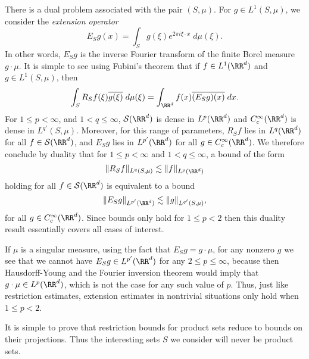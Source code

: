There is a dual problem associated with the pair $(S,\mu)$. For $g \in L^1(S,\mu)$, we consider the \emph{extension operator}
%
\[ E_S g(x) = \int_S g(\xi) e^{2 \pi i \xi \cdot x}\; d\mu(\xi). \]
%
In other words, $E_S g$ is the inverse Fourier transform of the finite Borel measure $g \cdot \mu$. It is simple to see using Fubini's theorem that if $f \in L^1(\RR^d)$ and $g \in L^1(S,\mu)$, then
%
\[ \int_S R_S f(\xi) \overline{g(\xi)}\; d\mu(\xi) = \int_{\RR^d} f(x) \overline{(E_S g)(x)}\; dx. \]
%
For $1 \leq p < \infty$, and $1 < q \leq \infty$, $\mathcal{S}(\RR^d)$ is dense in $L^p(\RR^d)$ and $C_c^\infty(\RR^d)$ is dense in $L^{q'}(S,\mu)$. Moreover, for this range of parameters, $R_S f$ lies in $L^q(\RR^d)$ for all $f \in \mathcal{S}(\RR^d)$, and $E_S g$ lies in $L^{p'}(\RR^d)$ for all $g \in C_c^\infty(\RR^d)$. We therefore conclude by duality that for $1 \leq p < \infty$ and $1 < q \leq \infty$, a bound of the form
%
\[ \| R_S f \|_{L^q(S,\mu)} \lesssim \| f \|_{L^p(\RR^d)} \]
%
holding for all $f \in \mathcal{S}(\RR^d)$ is equivalent to a bound
%
\[ \| E_S g \|_{L^{p'}(\RR^d)} \lesssim \| g \|_{L^{q'}(S,\mu)}, \]
%
for all $g \in C_c^\infty(\RR^d)$. Since bounds only hold for $1 \leq p < 2$ then this duality result essentially covers all cases of interest.

If $\mu$ is a singular measure, using the fact that $E_S g = g \cdot \mu$, for any nonzero $g$ we see that we cannot have $E_S g \in L^{p'}(\RR^d)$ for any $2 \leq p \leq \infty$, because then Hausdorff-Young and the Fourier inversion theorem would imply that $g \cdot \mu \in L^p(\RR^d)$, which is not the case for any such value of $p$. Thus, just like restriction estimates, extension estimates in nontrivial situations only hold when $1 \leq p < 2$.

It is simple to prove that restriction bounds for product sets reduce to bounds on their projections. Thus the interesting sets $S$ we consider will never be product sets.

